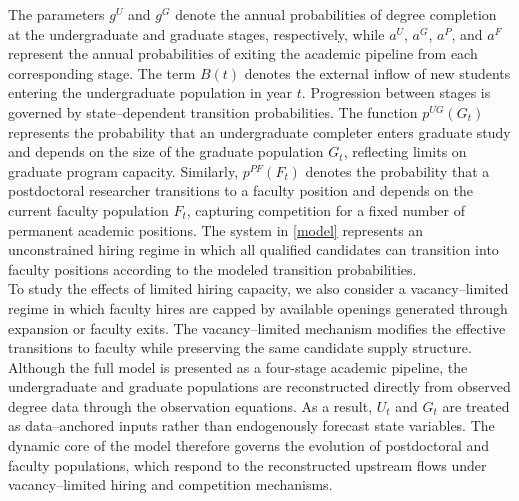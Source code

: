 \documentclass[3p]{elsarticle}%
\theoremstyle{definition}
\begin{document}
 The parameters $g^U$ and $g^G$ denote the annual probabilities of degree completion at the undergraduate and graduate stages, respectively, while $a^U$, $a^G$, $a^P$, and $a^F$ represent the annual probabilities of exiting the academic pipeline from each corresponding stage. The term $B(t)$ denotes the external inflow of new students entering the undergraduate population in year $t$. Progression between stages is governed by state--dependent transition probabilities. The function $p^{UG}(G_t)$ represents the probability that an undergraduate completer enters graduate study and depends on the size of the graduate population $G_t$, reflecting limits on graduate program capacity. Similarly, $p^{PF}(F_t)$ denotes the probability that a postdoctoral researcher transitions to a faculty position and depends on the current faculty population $F_t$, capturing competition for a fixed number of permanent academic positions. The system in \eqref{model} represents an unconstrained hiring regime in which all qualified candidates can transition into faculty positions according to the modeled transition probabilities.\\
 
 \noindent To study the effects of limited hiring capacity, we also consider a vacancy--limited regime in which faculty hires are capped by available openings generated through expansion or faculty exits. The vacancy--limited mechanism modifies the effective transitions to faculty while preserving the same candidate supply structure. Although the full model is presented as a four-stage academic pipeline, the undergraduate and graduate populations are reconstructed directly from observed degree data through  the observation equations. As a result, $U_t$ and $G_t$ are treated as data--anchored inputs rather than endogenously forecast state variables. The dynamic core of the model therefore governs the evolution of postdoctoral and faculty populations, which respond to the reconstructed upstream flows under vacancy--limited hiring and competition mechanisms. 
\end{document}
